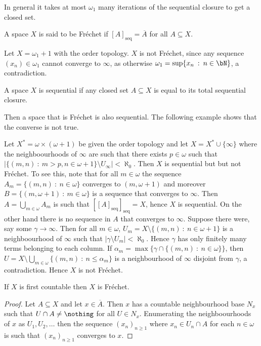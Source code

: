 \documentclass{article}
\newcommand{\seqcl}[1]{{[#1]_{\text{seq}}}}
\begin{document}
\begin{fact}
    In general it takes at most \(\omega_1\) many iterations of the sequential closure to get a closed set. 
\end{fact}

\begin{defn}
    A space \(X\) is said to be Fréchet if \(\seqcl{A} = \overline{A}\) for all \(A \subseteq X\).
\end{defn}
\begin{exam}
    Let \(X = \omega_1 + 1\) with the order topology. \(X\) is not Fréchet, since any sequence \((x_n) \in \omega_1\) cannot converge to \(\infty\), as otherwise \(\omega_1 = \sup\{x_n \: : \: n \in \bN\}\), a contradiction.
\end{exam}
\begin{defn}
    A space \(X\) is sequential if any closed set \(A \subseteq X\) is equal to its total sequential closure.
\end{defn}
Then a space that is Fréchet is also sequential. The following example shows that the converse is not true.

 
\begin{exam}
    Let \(X^{\ast} = \omega \times (\omega + 1)\) be given the order topology and let \(X =  X^{\ast} \cup \{\infty\}\) where the neighboourhoods  of \(\infty\) are such that there exists \(p \in \omega\) such that \(|\{(m, n) \: : \: m > p, n \in \omega + 1\} \setminus U_{\infty}| < \aleph_0\). Then \(X\) is sequential but but not Fréchet. To see this, note that for all \(m \in \omega\) the sequence \(A_m = \{(m, n) \: : \: n \in \omega\}\) converges to \((m, \omega + 1)\) and moreover \(B = \{(m, \omega + 1) \: : \: m \in \omega\}\) is a sequence that converges to \(\infty\). Then \(A = \bigcup_{m \in \omega} A_m\) is such that \(\seqcl{\seqcl{A}} = X\), hence \(X\) is sequential. On the other hand there is no sequence in \(A\) that converges to \(\infty\). Suppose there were, say some \(\gamma \to \infty\). Then for all \(m \in \omega\), \(U_m = X \setminus \{(m, n)\: : \: n \in \omega + 1\}\) is a neighboourhood of \(\infty\) such that \(|\gamma \setminus U_m| < \aleph_0\). Hence \(\gamma\) has only finitely many terms belonging to each column. If \(\alpha_m = \max\{\gamma \cap \{(m, n) \: : \: n \in \omega\}\}\), then \(U = X \setminus \bigcup_{m \in \omega} \{(m ,n )\: : \:  n \leq \alpha_m\}\) is a neighbourhood of \(\infty\) disjoint from \(\gamma\), a contradiction. Hence \(X\) is not Fréchet. 
\end{exam} 
\begin{prop}
    If \(X\) is first countable then \(X\) is Fréchet.
\end{prop}
\begin{proof}
    Let \(A \subseteq X\) and let \(x \in \overline{A}\). Then \(x\) has a countable neighbourhood base \(N_x\) such that \(U \cap A \neq \nothing\) for all \(U \in N_x\). Enumerating the neighboourhoods of \(x\) as \(U_1, U_2, \dots\) then the sequence \((x_n)_{n \ge 1}\) where \(x_n \in U_n \cap A\) for each \(n \in \omega\) is such that \((x_n)_{n \ge 1}\) converges to \(x\).
\end{proof}
\end{document}
